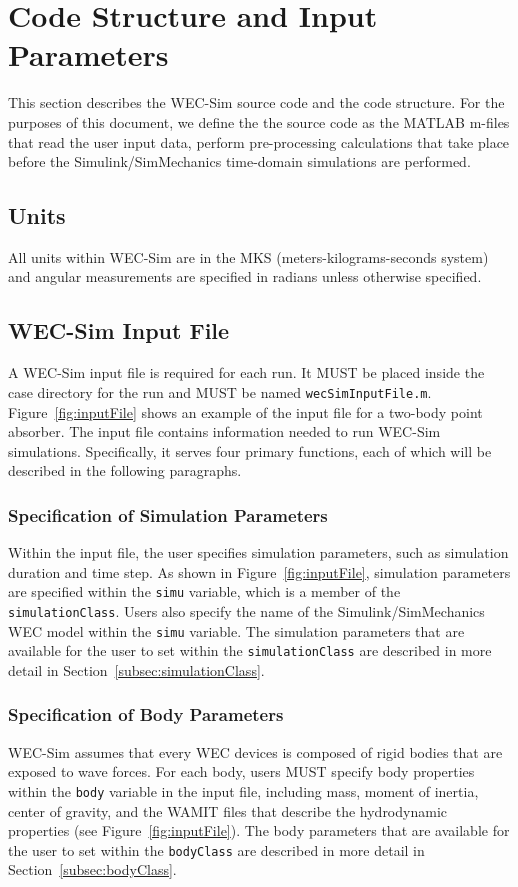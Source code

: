 \chapter{Code Structure and Input\\ Parameters} \label{ch:source code struct}
This section describes the WEC-Sim source code and the code structure. For the purposes of this document, we define the the source code as the MATLAB m-files that read the user input data, perform pre-processing calculations that take place before the Simulink/SimMechanics time-domain simulations are performed.

\section{Units}
All units within WEC-Sim are in the MKS (meters-kilograms-seconds system) and angular measurements are specified in radians unless otherwise specified.

\section{WEC-Sim Input File}
A WEC-Sim input file is required for each run. It MUST be placed inside the case directory for the run and MUST be named \texttt{wecSimInputFile.m}.  Figure~\ref{fig:inputFile} shows an example of the input file for a two-body point absorber. The input file contains information needed to run WEC-Sim simulations. Specifically, it serves four primary functions, each of which will be described in the following paragraphs.

\subsection{Specification of Simulation Parameters}
Within the input file, the user specifies simulation parameters, such as simulation duration and time step. As shown in Figure~\ref{fig:inputFile}, simulation parameters are specified within the \texttt{simu} variable, which is a member of the \texttt{simulationClass}. Users also specify the name of the Simulink/SimMechanics WEC model within the \texttt{simu} variable. The simulation parameters that are available for the user to set within the \texttt{simulationClass} are described in more detail in Section~\ref{subsec:simulationClass}.

\subsection{Specification of Body Parameters}
WEC-Sim assumes that every WEC devices is composed of rigid bodies that are exposed to wave forces. For each body, users MUST specify body properties within the \texttt{body} variable in the input file, including mass, moment of inertia, center of gravity, and the WAMIT files that describe the hydrodynamic properties (see Figure~\ref{fig:inputFile}). The body parameters that are available for the user to set within the \texttt{bodyClass} are described in more detail in Section~\ref{subsec:bodyClass}.

